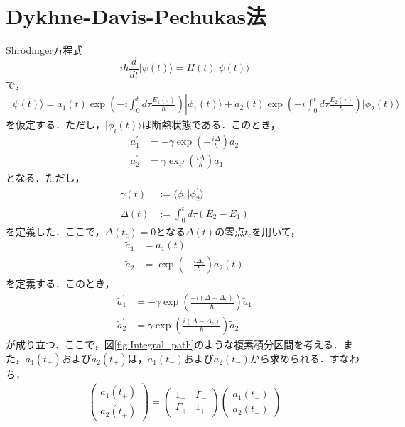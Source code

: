\chapter{Dykhne-Davis-Pechukas法}
Shr\"{o}dinger方程式
\begin{equation}
  i\hbar \frac{d}{dt} |\psi(t) \rangle = H(t) |\psi(t) \rangle
\end{equation}
で，
\begin{align}
  |\psi(t) \rangle = a_1(t) \exp \left(-i \int_0^t d\tau \frac{E_1(\tau)}{\hbar} \right) |\phi_1(t)\rangle + a_2(t) \exp \left(-i \int_0^t d\tau \frac{E_2(\tau)}{\hbar} \right) |\phi_2(t)\rangle
\end{align}
を仮定する．ただし，$|\phi_i(t)\rangle$は断熱状態である．このとき，
\begin{align}
  a_1^{\prime} &= -\gamma \exp \left( -\frac{i\Delta}{\hbar} \right) a_2\\
  a_2^{\prime} &= \gamma \exp \left( \frac{i\Delta}{\hbar} \right) a_1
\end{align}
となる．ただし，
\begin{align}
  \gamma(t) &:= \langle \phi_1 | \phi_2^{\prime} \rangle\\
  \Delta(t) &:= \int_0^t d\tau (E_2 - E_1)
\end{align}
を定義した．ここで，$\Delta(t_c) = 0$となる$\Delta(t)$の零点$t_c$を用いて，
\begin{align}
  \tilde{a}_1 &= a_1(t)\\
  \tilde{a}_2 &= \exp \left( - \frac{i\Delta_c}{\hbar} \right) a_2(t)
\end{align}
を定義する．このとき，
\begin{align}
  \tilde{a}_1^{\prime} &= -\gamma \exp \left( \frac{-i (\Delta - \Delta_c)}{\hbar} \right) \tilde{a}_1\\
  \tilde{a}_2^{\prime} &= \gamma \exp \left( \frac{i (\Delta - \Delta_c)}{\hbar} \right) \tilde{a}_2
\end{align}
が成り立つ．ここで，図\ref{fig:Integral_path}のような複素積分区間を考える．また，$a_1(t_+)$および$a_2(t_+)$は，$a_1(t_-)$および$a_2(t_-)$から求められる．すなわち，
\begin{align}
  \begin{pmatrix}
    a_1(t_+)\\
    a_2(t_+)
  \end{pmatrix}
  =
  \begin{pmatrix}
    1_- & \Gamma_-\\
    \Gamma_+ & 1_+
  \end{pmatrix}
  \begin{pmatrix}
    a_1(t_-)\\
    a_2(t_-)
  \end{pmatrix} \label{Appendix_TM}
\end{align}
